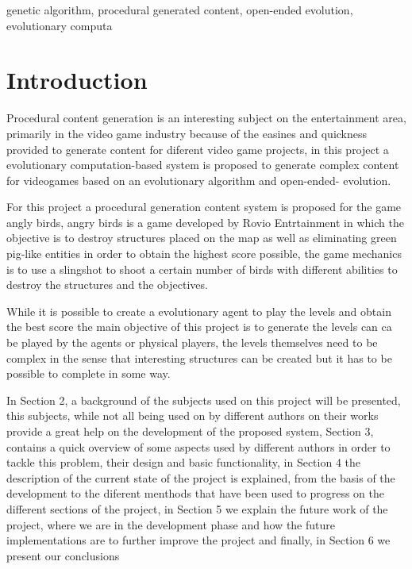 \documentclass[conference]{IEEEtran}
\begin{document}
\begin{IEEEkeywords}
genetic algorithm, procedural generated content, open-ended evolution, evolutionary computa
\end{IEEEkeywords}

\section{Introduction}
Procedural content generation is an interesting subject on the entertainment area, primarily in the video game industry because of the easines and quickness provided to generate content for diferent video game projects, in this project a evolutionary computation-based system is proposed to generate complex content for videogames based on an evolutionary algorithm and open-ended- evolution.

For this project a procedural generation content system is proposed for the game angly birds, angry birds is a game developed by Rovio Entrtainment in which the objective is to destroy structures placed on the map as well as eliminating green pig-like entities in order to obtain the highest score possible, the game mechanics is to use a slingshot to shoot a certain number of birds with different abilities to destroy the structures and the objectives. \cite{RovioEntertainmentCorporation2009}

While it is possible to create a evolutionary agent to play the levels and obtain the best score the main objective of this project is to generate the levels can ca be played by the agents or physical players, the levels themselves need to be complex in the sense that interesting structures can be created but it has to be possible to complete in some way.

In Section 2, a background of the subjects used on this project will be presented, this subjects, while not all being used on by different authors on their works provide a great help on the development of the proposed system, Section 3, contains a quick overview of some aspects used by different authors in order to tackle this problem, their design and basic functionality, in Section 4 the description of the current state of the project is explained, from the basis of the development to the diferent menthods that have been used to progress on the different sections of the project, in Section 5 we explain the future work of the project, where we are in the development phase and how the future implementations are to further improve the project and finally, in Section 6 we present our conclusions
 
\end{document}
